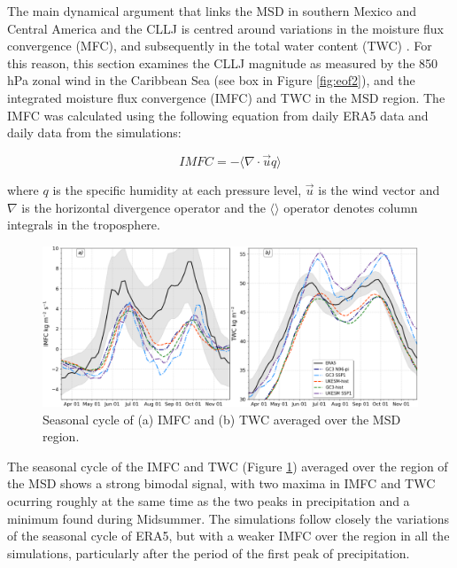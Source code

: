The main dynamical argument that links the MSD in southern Mexico and Central America and the CLLJ is centred around variations in the moisture flux convergence (MFC), and subsequently in the total water content (TWC) \citep[see e.g.][]{gamble2008,herrera2015,martinez2019,zermeno2019}. For this reason, this section examines the CLLJ magnitude as measured by the 850 hPa zonal wind in the Caribbean Sea (see box in Figure \ref{fig:eof2}), and the integrated moisture flux convergence (IMFC) and TWC in the MSD region.
The IMFC was calculated using the following equation from daily ERA5 data and daily data from the simulations:

\begin{equation}
IMFC=-\Bigg\langle \nabla \cdot \vec{u}q \Bigg \rangle
\label{eq:waterbudget}
\end{equation}

\noindent where $q$ is the specific humidity at each pressure level, $\vec{u}$ is the wind vector and $\nabla$ is the horizontal divergence operator and the $\langle \rangle$ operator denotes column integrals in the troposphere.

 \begin{figure}[t!]
\includegraphics[width=\linewidth]{figures/imfd_index_seasonal}
\caption[Seasonal cycle of IMFC and TWC]{Seasonal cycle of (a) IMFC and (b) TWC averaged over the MSD region.}
\label{fig:imfd_cycle}
\end{figure}

The seasonal cycle of the IMFC and TWC (Figure \ref{fig:imfd_cycle}) averaged over the region of the MSD shows a strong bimodal signal, with two maxima in IMFC and TWC ocurring roughly at the same time as the two peaks in precipitation and a minimum found during Midsummer. The simulations follow closely the variations of the seasonal cycle of ERA5, but with a weaker IMFC over the region in all the simulations, particularly after the period of the first peak of precipitation. 

